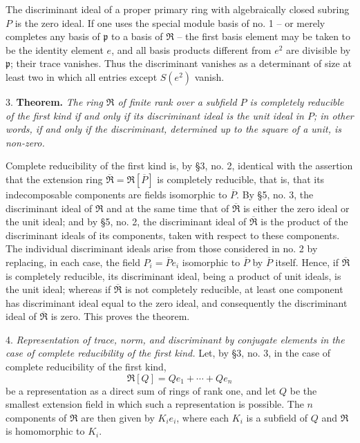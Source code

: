 \documentclass[11pt]{article}
\providecommand{\mR}{\mathfrak{R}}
\providecommand{\bR}{\overline{\mathfrak{R}}}
\providecommand{\mpideal}{\mathfrak{p}}
\providecommand{\bP}{\overline{P}}
\begin{document}
The discriminant ideal of a proper primary ring with algebraically closed subring $P$ is the zero ideal. If one uses the special module basis of no. 1 -- or merely completes any basis of $\mpideal$ to a basis of $\mR$ -- the first basis element may be taken to be the identity element $e$, and all basis products different from $e^2$ are divisible by $\mpideal$; their trace vanishes. Thus the discriminant vanishes as a determinant of size at least two in which all entries except $S(e^2)$ vanish.

3. \textbf{Theorem.} \emph{The ring $\mR$ of finite rank over a subfield $P$ is completely reducible of the first kind if and only if its discriminant ideal is the unit ideal in $P$; in other words, if and only if the discriminant, determined up to the square of a unit, is non-zero.}

Complete reducibility of the first kind is, by §3, no. 2, identical with the assertion that the extension ring $\bR=\mR[\bP]$ is completely reducible, that is, that its indecomposable components are fields isomorphic to $\bP$. By §5, no. 3, the discriminant ideal of $\mR$ and at the same time that of $\bR$ is either the zero ideal or the unit ideal; and by §5, no. 2, the discriminant ideal of $\bR$ is the product of the discriminant ideals of its components, taken with respect to these components. The individual discriminant ideals arise from those considered in no. 2 by replacing, in each case, the field $P_i=\bP e_i$ isomorphic to $\bP$ by $\bP$ itself. Hence, if $\bR$ is completely reducible, its discriminant ideal, being a product of unit ideals, is the unit ideal; whereas if $\bR$ is not completely reducible, at least one component has discriminant ideal equal to the zero ideal, and consequently the discriminant ideal of $\bR$ is zero. This proves the theorem.

4. \emph{Representation of trace, norm, and discriminant by conjugate elements in the case of complete reducibility of the first kind.} Let, by §3, no. 3, in the case of complete reducibility of the first kind,
\[
        \mR[Q]=Qe_1+\cdots+Qe_n
\]
be a representation as a direct sum of rings of rank one, and let $Q$ be the smallest extension field in which such a representation is possible. The $n$ components of $\mR$ are then given by $K_i e_i$, where each $K_i$ is a subfield of $Q$ and $\mR$ is homomorphic to $K_i$.
\end{document}
